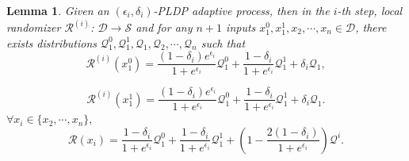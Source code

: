 \documentclass[letterpaper]{article} %
\newtheorem{lemma}{Lemma}
\begin{document}
\begin{lemma}\label{R2Q}
Given an $(\epsilon_i,\delta_i)$-PLDP adaptive process, then in the $i$-th step, local randomizer  $\mathcal{R}^{(i)}$: $\mathcal{D} \rightarrow \mathcal{S}$ and for any $n+1$ inputs $x_1^0, x_1^1, x_2, \cdots, x_n \in \mathcal{D}$, there exists distributions
$\mathcal{Q}_1^0, \mathcal{Q}_1^1, \mathcal{Q}_1, \mathcal{Q}_2, \cdots, \mathcal{Q}_n$ such that
\begin{equation}
\mathcal{R}^{(i)}(x_1^0) = \frac{(1-\delta_i)e^{\epsilon_i}}{1+e^{\epsilon_i}}\mathcal{Q}_1^0+\frac{1-\delta_i}{1+e^{\epsilon_i}}\mathcal{Q}_1^1 + \delta_i \mathcal{Q}_1,
\end{equation}

\begin{equation}
\mathcal{R}^{(i)}(x_1^1) = \frac{(1-\delta_i)e^{\epsilon_i}}{1+e^{\epsilon_i}}\mathcal{Q}_1^0+\frac{1-\delta_i}{1+e^{\epsilon_i}}\mathcal{Q}_1^1 + \delta_i \mathcal{Q}_1.
\end{equation}
$\forall x_i \in \{x_2, \cdots, x_n\},$
\begin{equation}\label{DecomposXi}
 \mathcal{R}(x_i) = \frac{1-\delta_i}{1+e^{\epsilon_i}}\mathcal{Q}^0_1+\frac{1-\delta_i}{1+e^{\epsilon_i}}\mathcal{Q}^1_1 +\left(1-\frac{2(1-\delta_i)}{1+e^{\epsilon_i}}\right)\mathcal{Q}^i.
\end{equation}

\end{lemma}
\end{document}
